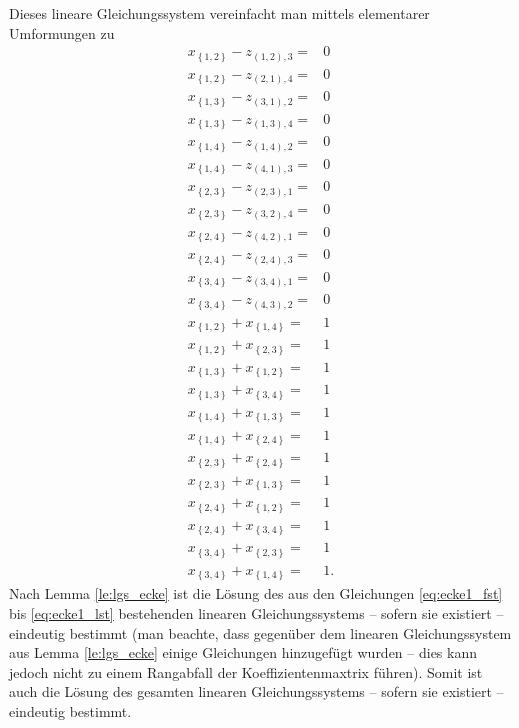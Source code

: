 \documentclass[10p,a4paper,BCOR = 12mm, DIV=15]{scrbook}
\begin{document}
{\begin{bew}
Dieses lineare Gleichungssystem vereinfacht man mittels elementarer Umformungen zu
{
\allowdisplaybreaks
\begin{align}
x_{\left\{1, 2\right\}} - z_{\left(1, 2\right), 3} = & 0 \nonumber \\
x_{\left\{1, 2\right\}} - z_{\left(2, 1\right), 4} = & 0 \nonumber \\
x_{\left\{1, 3\right\}} - z_{\left(3, 1\right), 2} = & 0 \nonumber \\
x_{\left\{1, 3\right\}} - z_{\left(1, 3\right), 4} = & 0 \nonumber \\
x_{\left\{1, 4\right\}} - z_{\left(1, 4\right), 2} = & 0 \nonumber \\
x_{\left\{1, 4\right\}} - z_{\left(4, 1\right), 3} = & 0 \nonumber \\
x_{\left\{2, 3\right\}} - z_{\left(2, 3\right), 1} = & 0 \nonumber \\
x_{\left\{2, 3\right\}} - z_{\left(3, 2\right), 4} = & 0 \nonumber \\
x_{\left\{2, 4\right\}} - z_{\left(4, 2\right), 1} = & 0 \nonumber \\
x_{\left\{2, 4\right\}} - z_{\left(2, 4\right), 3} = & 0 \nonumber \\
x_{\left\{3, 4\right\}} - z_{\left(3, 4\right), 1} = & 0 \nonumber \\
x_{\left\{3, 4\right\}} - z_{\left(4, 3\right), 2} = & 0 \nonumber \\
x_{\left\{1, 2\right\}} + x_{\left\{1, 4\right\}} = & 1 \label{eq:ecke1_fst} \\
x_{\left\{1, 2\right\}} + x_{\left\{2, 3\right\}} = & 1 \\
x_{\left\{1, 3\right\}} + x_{\left\{1, 2\right\}} = & 1 \\
x_{\left\{1, 3\right\}} + x_{\left\{3, 4\right\}} = & 1 \\
x_{\left\{1, 4\right\}} + x_{\left\{1, 3\right\}} = & 1 \\
x_{\left\{1, 4\right\}} + x_{\left\{2, 4\right\}} = & 1 \\
x_{\left\{2, 3\right\}} + x_{\left\{2, 4\right\}} = & 1 \\
x_{\left\{2, 3\right\}} + x_{\left\{1, 3\right\}} = & 1 \\
x_{\left\{2, 4\right\}} + x_{\left\{1, 2\right\}} = & 1 \\
x_{\left\{2, 4\right\}} + x_{\left\{3, 4\right\}} = & 1 \\
x_{\left\{3, 4\right\}} + x_{\left\{2, 3\right\}} = & 1 \\
x_{\left\{3, 4\right\}} + x_{\left\{1, 4\right\}} = & 1. \label{eq:ecke1_lst}
\end{align}
}
Nach Lemma \ref{le:lgs_ecke} ist die Lösung des aus den Gleichungen \eqref{eq:ecke1_fst} bis \eqref{eq:ecke1_lst} bestehenden linearen Gleichungssystems -- sofern sie existiert -- eindeutig bestimmt (man beachte, dass gegenüber dem linearen Gleichungssystem aus Lemma \ref{le:lgs_ecke} einige Gleichungen hinzugefügt wurden -- dies kann jedoch nicht zu einem Rangabfall der Koeffizientenmaxtrix führen). Somit ist auch die Lösung des gesamten linearen Gleichungssystems -- sofern sie existiert -- eindeutig bestimmt.


\end{bew}}
\end{document}

